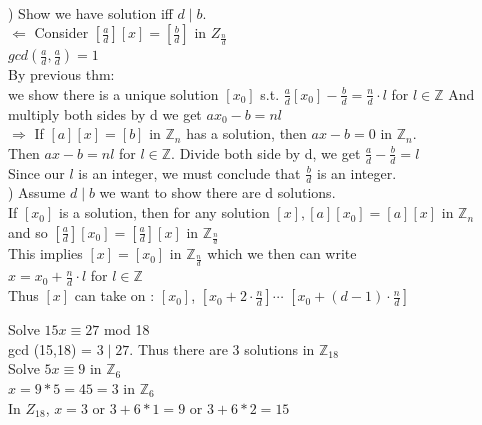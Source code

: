 \documentclass{article}
\newcommand\Z{\ensuremath{\mathbb{Z}}}
\begin{document}
\begin{Proof}
    \\ \hfill {}) Show we have solution iff  $d \mid b$.
    \\$\Leftarrow $ Consider  $[\frac{a}{d}] [x] = [\frac{b}{d}]$ in $Z_{\frac{n}{d}}$
    \\ $gcd(\frac{a}{d}, \frac{a}{d}) = 1$
    \\By previous thm:
    \\we show there is a unique solution $[x_0]$ s.t.
    $\frac{a}{d}[x_0]-\frac{b}{d} = \frac{n}{d}\cdot l $ for $l \in \Z$
    And multiply both sides by d we get $ax_0 -b = nl$
    \\
    \hfill \break
    $\Rightarrow$ If $[a][x] = [b]$ in $\Z_n$ has a solution, then 
    $ax - b = 0$ in $\Z_n$. 
    \\ Then $ax - b = nl$ for $l \in \Z$.
    Divide both side by d, we get $\frac{a}{d} - \frac{b}{d} = l $ 
    \\Since our $l$ is an integer, we must conclude that $ \frac{b}{d}$ is an integer.
    \\ \hfill {}) Assume $d\mid b$ we want to show there are d solutions. 
    \\If $[x_0]$ is a solution, then for any solution $[x], [a][x_0] = [a][x]$ in $\Z_n$
    \\ and so $[\frac{a}{d}][x_0] = [\frac{a}{d}][x]$ in  $\Z_{\frac{n}{d}}$
    \\ This implies $[x] = [x_0]$ in $\Z_{\frac{n}{d}}$ which we then can write 
    \\$x = x_0 + \frac{n}{d}\cdot l$ for $ l \in \Z$
    \\ Thus $[x]$ can take on : $[x_0]$, $[x_0 + 2\cdot \frac{n}{d}]$$ \cdots$ $[x_0 + (d-1)\cdot \frac{n}{d}]$
\end{Proof}
\begin{Example}
    Solve $15 x \equiv 27$ mod 18
    \\ gcd (15,18) = $3 \mid 27$. Thus there are 3 solutions in $\Z_{18}$
    \\ Solve $5x \equiv 9 $ in $\Z_6$
    \\ $x = 9 * 5 = 45 = 3 $ in $\Z_6$
    \\In $Z_18$, $x = 3$ or $3+ 6*1 = 9 $ or $3+6*2= 15$
\end{Example}


\newpage


\end{document}
